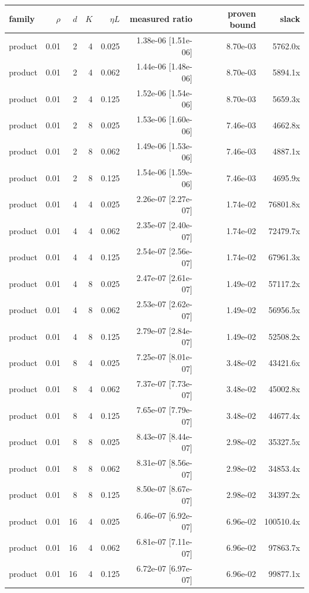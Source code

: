 \begin{tabular}{lrrrrrrr}
\toprule
family & $\rho$ & $d$ & $K$ & $\eta L$ & measured ratio & proven bound & slack \\
\midrule
product & 0.01 & 2 & 4 & 0.025 & 1.38e-06 [1.51e-06] & 8.70e-03 & 5762.0x \\
product & 0.01 & 2 & 4 & 0.062 & 1.44e-06 [1.48e-06] & 8.70e-03 & 5894.1x \\
product & 0.01 & 2 & 4 & 0.125 & 1.52e-06 [1.54e-06] & 8.70e-03 & 5659.3x \\
product & 0.01 & 2 & 8 & 0.025 & 1.53e-06 [1.60e-06] & 7.46e-03 & 4662.8x \\
product & 0.01 & 2 & 8 & 0.062 & 1.49e-06 [1.53e-06] & 7.46e-03 & 4887.1x \\
product & 0.01 & 2 & 8 & 0.125 & 1.54e-06 [1.59e-06] & 7.46e-03 & 4695.9x \\
product & 0.01 & 4 & 4 & 0.025 & 2.26e-07 [2.27e-07] & 1.74e-02 & 76801.8x \\
product & 0.01 & 4 & 4 & 0.062 & 2.35e-07 [2.40e-07] & 1.74e-02 & 72479.7x \\
product & 0.01 & 4 & 4 & 0.125 & 2.54e-07 [2.56e-07] & 1.74e-02 & 67961.3x \\
product & 0.01 & 4 & 8 & 0.025 & 2.47e-07 [2.61e-07] & 1.49e-02 & 57117.2x \\
product & 0.01 & 4 & 8 & 0.062 & 2.53e-07 [2.62e-07] & 1.49e-02 & 56956.5x \\
product & 0.01 & 4 & 8 & 0.125 & 2.79e-07 [2.84e-07] & 1.49e-02 & 52508.2x \\
product & 0.01 & 8 & 4 & 0.025 & 7.25e-07 [8.01e-07] & 3.48e-02 & 43421.6x \\
product & 0.01 & 8 & 4 & 0.062 & 7.37e-07 [7.73e-07] & 3.48e-02 & 45002.8x \\
product & 0.01 & 8 & 4 & 0.125 & 7.65e-07 [7.79e-07] & 3.48e-02 & 44677.4x \\
product & 0.01 & 8 & 8 & 0.025 & 8.43e-07 [8.44e-07] & 2.98e-02 & 35327.5x \\
product & 0.01 & 8 & 8 & 0.062 & 8.31e-07 [8.56e-07] & 2.98e-02 & 34853.4x \\
product & 0.01 & 8 & 8 & 0.125 & 8.50e-07 [8.67e-07] & 2.98e-02 & 34397.2x \\
product & 0.01 & 16 & 4 & 0.025 & 6.46e-07 [6.92e-07] & 6.96e-02 & 100510.4x \\
product & 0.01 & 16 & 4 & 0.062 & 6.81e-07 [7.11e-07] & 6.96e-02 & 97863.7x \\
product & 0.01 & 16 & 4 & 0.125 & 6.72e-07 [6.97e-07] & 6.96e-02 & 99877.1x \\

\end{tabular}
